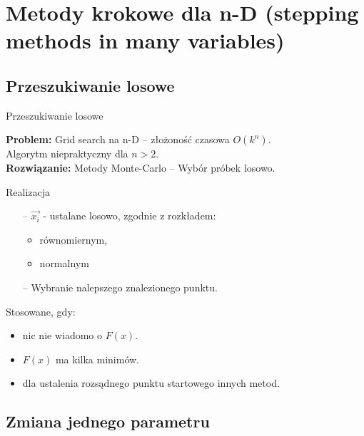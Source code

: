 \section{Metody krokowe dla n-D (stepping methods in many variables)}

\subsection{Przeszukiwanie losowe}
  \begin{frame}{Przeszukiwanie losowe}

    \begin{block}{}
      \textbf{Problem: } Grid search na n-D -- złożoność czasowa $O(k^n)$.\\
      Algorytm niepraktyczny dla $n > 2$.\\
      \textbf{Rozwiązanie: } Metody Monte-Carlo -- Wybór próbek losowo.
    \end{block}

    \begin{block}{Realizacja}
   	  \begin{itemize}
   	  	\item[--] $\vec{x_i}$ - ustalane losowo, zgodnie z rozkładem:
   	  	\begin{itemize}
   		  \item równomiernym,
   		  \item normalnym
   	  	\end{itemize}
   	  	\item[--] Wybranie nalepszego znalezionego punktu.
   	  \end{itemize}
 	  \end{block}

    \begin{block}{}
      Stosowane, gdy:
      \begin{itemize}
        \item nic nie wiadomo o $F(x)$.
        \item $F(x)$ ma kilka minimów.
        \item dla ustalenia rozsądnego punktu startowego innych metod.
      \end{itemize}
    \end{block}
  \end{frame}

\subsection{Zmiana jednego parametru }

